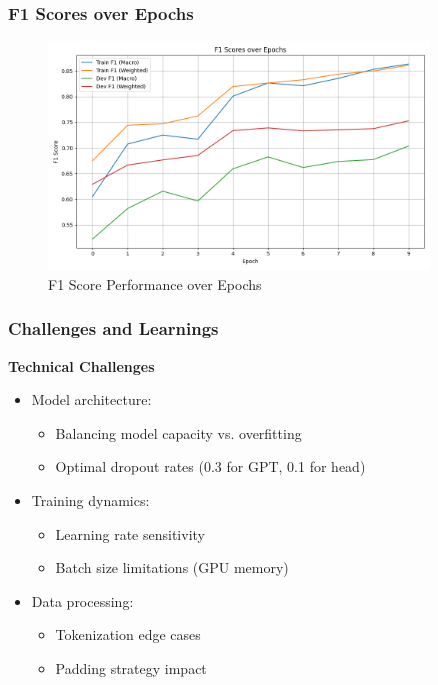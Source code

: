 \documentclass{beamer}
\begin{document}
\begin{frame}
\frametitle{F1 Scores over Epochs}
\centering
\begin{figure}
  \includegraphics[width=0.9\textwidth]{last-linear-layer/f1_metrics.png}
  \caption{F1 Score Performance over Epochs}
\end{figure}
\end{frame}

\begin{frame}
\frametitle{Challenges and Learnings}
\textbf{Technical Challenges}
\begin{itemize}
  \item Model architecture:
  \begin{itemize}
    \item Balancing model capacity vs. overfitting
    \item Optimal dropout rates (0.3 for GPT, 0.1 for head)
  \end{itemize}
  \item Training dynamics:
  \begin{itemize}
    \item Learning rate sensitivity
    \item Batch size limitations (GPU memory)
  \end{itemize}
  \item Data processing:
  \begin{itemize}
    \item Tokenization edge cases
    \item Padding strategy impact
  \end{itemize}
\end{itemize}
\end{frame}
\end{document}
